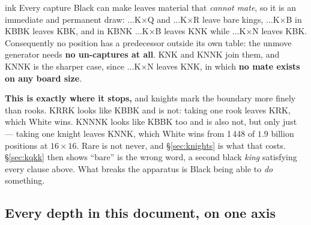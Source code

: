 \documentclass[10pt]{article}
\begin{document}
\begin{result}[title={The invariant that makes them tractable}]{ink}
Every capture Black can make leaves material that \emph{cannot mate}, so it is
an immediate and permanent draw:
\;$\ldots$K$\times$Q and $\ldots$K$\times$R leave bare kings,
$\ldots$K$\times$B in KBBK leaves KBK,
and in KBNK $\ldots$K$\times$B leaves KNK while $\ldots$K$\times$N leaves KBK.
Consequently no position has a predecessor outside its own table: the unmove
generator needs \textbf{no un-captures at all}. KNK and KNNK join them, and
KNNK is the sharper case, since $\ldots$K$\times$N leaves KNK, in which
\textbf{no mate exists on any board size}.

\medskip
\textbf{This is exactly where it stops,} and knights mark the boundary more
finely than rooks. KRRK looks like KBBK and is not: taking one rook leaves KRK,
which White wins. KNNNK looks like KBBK too and is also not, but only just ---
taking one knight leaves KNNK, which White wins from 1\,448 of $1.9$ billion
positions at $16\times16$. Rare is not never, and \S\ref{sec:knights} is what
that costs. \S\ref{sec:kqkk} then shows ``bare'' is the wrong word, a second
black \emph{king} satisfying every clause above. What breaks the apparatus is
Black being able to \emph{do} something.
\end{result}

\subsection{Every depth in this document, on one axis}\label{sub:all-depths}
\end{document}
